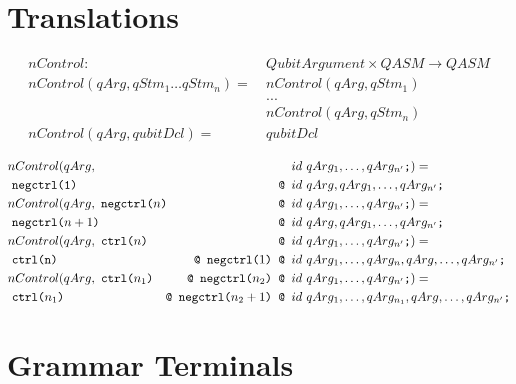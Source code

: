 \begin{appendices}
\chapter{Translations}
\label{appendix:translation}

\begin{align*}
    nControl : \ & QubitArgument \times QASM \to QASM\\
    nControl(qArg, qStm_1 \dots qStm_n) = \ & nControl(qArg, qStm_1)\\
        & ...\\
        & nControl(qArg, qStm_n)\\
    nControl(qArg, qubitDcl) = \ & qubitDcl\\
\end{align*}
{\small
    \begin{align*}
        &nControl(qArg,  &&  id \ qArg_1, \dots, qArg_{n'} \texttt{;}) = \\  
        & \ \texttt{negctrl(1) } &\texttt{@ }& id \ qArg, qArg_1, \dots, qArg_{n'}\texttt{;}\\
        &nControl(qArg,  \ \rlap{$\texttt{negctrl(}n \texttt{) }$} &\texttt{@ }& id \ qArg_1, \dots, qArg_{n'} \texttt{;}) = \\
        & \ \texttt{negctrl(}n+1 \texttt{) } &\texttt{@ }& id \ qArg, qArg_1, \dots, qArg_{n'}\texttt{;}\\
        &nControl(qArg,  \ \rlap{$\texttt{ctrl(}n\texttt{) }$} &\texttt{@ }& id \ qArg_1, \dots, qArg_{n'} \texttt{;}) = \\
        & \ \texttt{ctrl(n) } &\texttt{@ } \texttt{negctrl(}1\texttt{) } \texttt{@ }&id \ qArg_1, \dots, qArg_n, qArg, \dots, qArg_{n'}\texttt{;}\\
        &nControl(qArg,  \ \texttt{ctrl(}n_1 \texttt{)} & \texttt{@ } \texttt{negctrl(}n_2\texttt{) } \texttt{@ }& id \ qArg_1, \dots, qArg_{n'} \texttt{;}) = \\
        & \ \texttt{ctrl(}n_1 \texttt{) } &\texttt{@ } \texttt{negctrl(}n_2+1\texttt{) } \texttt{@ }& id \  qArg_1, \dots, qArg_{n_1}, qArg, \dots, qArg_{n'}\texttt{;}
    \end{align*}
}%

\chapter{Grammar Terminals}
\label{appendix:grammar_terminals}



\end{appendices}
